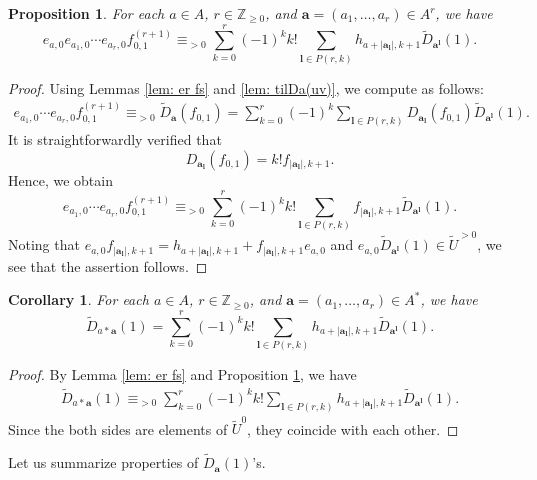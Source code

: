 \documentclass[12pt,a4paper]{amsart}
\newtheorem{prop}[thm]{Proposition}
\newtheorem{cor}[thm]{Corollary}
\theoremstyle{definition}
\numberwithin{equation}{subsection}
\begin{document}
\begin{prop}\label{prop: er fr+1}
  For each $a \in A$, $r \in \mathbb{Z}_{\geq 0}$, and $\mathbf{a} = (a_1,\dots,a_r) \in A^r$, we have
  \[
    e_{a,0} e_{a_1,0} \cdots e_{a_r,0} f_{0,1}^{(r+1)} \equiv_{>0} \sum_{k=0}^r (-1)^k k! \sum_{\mathbf{l} \in P(r,k)} h_{a+|\mathbf{a}_\mathbf{l}|,k+1} \tilde{D}_{\mathbf{a}^\mathbf{l}}(1).
  \]
\end{prop}
\begin{proof}
  Using Lemmas \ref{lem: er fs} and \ref{lem: tilDa(uv)}, we compute as follows:
  \begin{align*}
    e_{a_1,0} \cdots e_{a_r,0} f_{0,1}^{(r+1)}
    \equiv_{>0}
    \tilde{D}_{\mathbf{a}}(f_{0,1})
    =
    \sum_{k=0}^r (-1)^k \sum_{\mathbf{l} \in P(r,k)} D_{\mathbf{a}_\mathbf{l}}(f_{0,1}) \tilde{D}_{\mathbf{a}^\mathbf{l}}(1).
  \end{align*}
  It is straightforwardly verified that
  \[
    D_{\mathbf{a}_\mathbf{l}}(f_{0,1}) = k! f_{|\mathbf{a}_\mathbf{l}|,k+1}.
  \]
  Hence, we obtain
  \[
    e_{a_1,0} \cdots e_{a_r,0} f_{0,1}^{(r+1)} \equiv_{>0} \sum_{k=0}^r (-1)^k k! \sum_{\mathbf{l} \in P(r,k)} f_{|\mathbf{a}_\mathbf{l}|,k+1} \tilde{D}_{\mathbf{a}^\mathbf{l}}(1).
  \]
  Noting that $e_{a,0} f_{|\mathbf{a}_\mathbf{l}|,k+1} = h_{a+|\mathbf{a}_\mathbf{l}|,k+1} + f_{|\mathbf{a}_\mathbf{l}|,k+1} e_{a,0}$ and $e_{a,0} \tilde{D}_{\mathbf{a}^\mathbf{l}}(1) \in \tilde{U}^{>0}$, we see that the assertion follows.
\end{proof}

\begin{cor}\label{cor: tilD ab*pi}
  For each $a \in A$, $r \in \mathbb{Z}_{\geq 0}$, and $\mathbf{a} = (a_1,\dots,a_r) \in A^*$, we have
  \[
    \tilde{D}_{a*\mathbf{a}}(1) = \sum_{k=0}^r (-1)^k k! \sum_{\mathbf{l} \in P(r,k)} h_{a+|\mathbf{a}_\mathbf{l}|,k+1} \tilde{D}_{\mathbf{a}^\mathbf{l}}(1).
  \]
\end{cor}
\begin{proof}
  By Lemma \ref{lem: er fs} and Proposition \ref{prop: er fr+1}, we have
  \begin{align*}
    \tilde{D}_{a*\mathbf{a}}(1) \equiv_{>0} \sum_{k=0}^r (-1)^k k! \sum_{\mathbf{l} \in P(r,k)} h_{a+|\mathbf{a}_\mathbf{l}|,k+1} \tilde{D}_{\mathbf{a}^\mathbf{l}}(1).
  \end{align*}
  Since the both sides are elements of $\tilde{U}^0$, they coincide with each other.
\end{proof}

Let us summarize properties of $\tilde{D}_\mathbf{a}(1)$'s.
\end{document}
